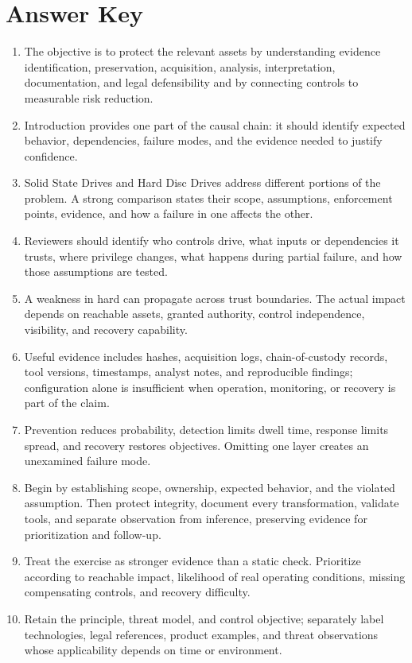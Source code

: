 \documentclass[11pt]{article}
\begin{document}
\section*{Answer Key}
\begin{enumerate}
\item The objective is to protect the relevant assets by understanding evidence identification, preservation, acquisition, analysis, interpretation, documentation, and legal defensibility and by connecting controls to measurable risk reduction.
\item Introduction provides one part of the causal chain: it should identify expected behavior, dependencies, failure modes, and the evidence needed to justify confidence.
\item Solid State Drives and Hard Disc Drives address different portions of the problem. A strong comparison states their scope, assumptions, enforcement points, evidence, and how a failure in one affects the other.
\item Reviewers should identify who controls drive, what inputs or dependencies it trusts, where privilege changes, what happens during partial failure, and how those assumptions are tested.
\item A weakness in hard can propagate across trust boundaries. The actual impact depends on reachable assets, granted authority, control independence, visibility, and recovery capability.
\item Useful evidence includes hashes, acquisition logs, chain-of-custody records, tool versions, timestamps, analyst notes, and reproducible findings; configuration alone is insufficient when operation, monitoring, or recovery is part of the claim.
\item Prevention reduces probability, detection limits dwell time, response limits spread, and recovery restores objectives. Omitting one layer creates an unexamined failure mode.
\item Begin by establishing scope, ownership, expected behavior, and the violated assumption. Then protect integrity, document every transformation, validate tools, and separate observation from inference, preserving evidence for prioritization and follow-up.
\item Treat the exercise as stronger evidence than a static check. Prioritize according to reachable impact, likelihood of real operating conditions, missing compensating controls, and recovery difficulty.
\item Retain the principle, threat model, and control objective; separately label technologies, legal references, product examples, and threat observations whose applicability depends on time or environment.
\end{enumerate}
\end{document}
